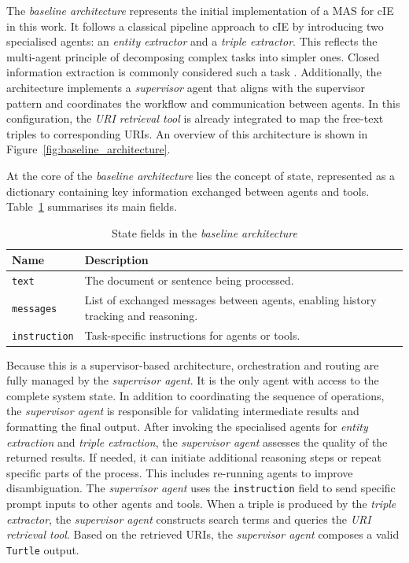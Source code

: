 \documentclass[a4paper,oneside,bibliography=totoc]{scrbook}
\begin{document}
The \textit{baseline architecture} represents the initial implementation of a \ac{MAS} for \ac{cIE} in this work. It follows a classical pipeline approach to \ac{cIE} by introducing two specialised agents: an \textit{entity extractor} and a \textit{triple extractor}. This reflects the multi-agent principle of decomposing complex tasks into simpler ones. Closed information extraction is commonly considered such a task \cite{Josifoski2021}. Additionally, the architecture implements a \textit{supervisor} agent that aligns with the supervisor pattern and coordinates the workflow and communication between agents. In this configuration, the \textit{\ac{URI} retrieval tool} is already integrated to map the free-text triples to corresponding \acp{URI}. An overview of this architecture is shown in Figure~\ref{fig:baseline_architecture}.

At the core of the \textit{baseline architecture} lies the concept of state, represented as a dictionary containing key information exchanged between agents and tools. Table~\ref{tab:baseline_state} summarises its main fields.

\begin{table}[h]
  \centering
  \caption{State fields in the \textit{baseline architecture}}
  \label{tab:baseline_state}
  \begin{tabular}{p{3cm}p{10cm}}
    \toprule
    \textbf{Name}        & \textbf{Description}                                                                \\
    \midrule
    \texttt{text}        & The document or sentence being processed.                                           \\
    \texttt{messages}    & List of exchanged messages between agents, enabling history tracking and reasoning. \\
    \texttt{instruction} & Task-specific instructions for agents or tools.                                     \\
    \bottomrule
  \end{tabular}
\end{table}

Because this is a supervisor-based architecture, orchestration and routing are fully managed by the \textit{supervisor agent}. It is the only agent with access to the complete system state. In addition to coordinating the sequence of operations, the \textit{supervisor agent} is responsible for validating intermediate results and formatting the final output. After invoking the specialised agents for \textit{entity extraction} and \textit{triple extraction}, the \textit{supervisor agent} assesses the quality of the returned results. If needed, it can initiate additional reasoning steps or repeat specific parts of the process. This includes re-running agents to improve disambiguation. The \textit{supervisor agent} uses the \texttt{instruction} field to send specific prompt inputs to other agents and tools. When a triple is produced by the \textit{triple extractor}, the \textit{supervisor agent} constructs search terms and queries the \textit{\ac{URI} retrieval tool}. Based on the retrieved \acp{URI}, the \textit{supervisor agent} composes a valid \texttt{Turtle} output.
\end{document}
